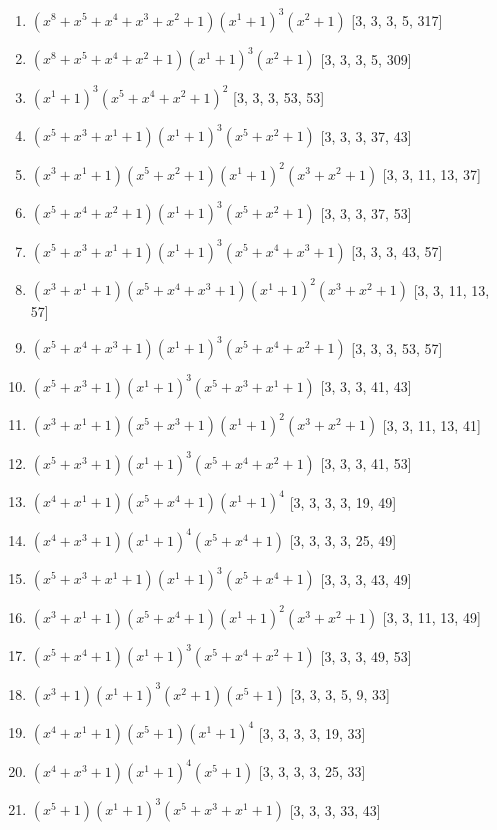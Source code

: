 \documentclass[10pt,twocolumn]{article}
\begin{document}
\begin{enumerate}
\item $(x^{8} + x^{5} + x^{4} + x^{3} + x^{2} + 1)(x^{1} + 1)^{3}(x^{2} + 1)$  [3, 3, 3, 5, 317]
\item $(x^{8} + x^{5} + x^{4} + x^{2} + 1)(x^{1} + 1)^{3}(x^{2} + 1)$  [3, 3, 3, 5, 309]
\item $(x^{1} + 1)^{3}(x^{5} + x^{4} + x^{2} + 1)^{2}$  [3, 3, 3, 53, 53]
\item $(x^{5} + x^{3} + x^{1} + 1)(x^{1} + 1)^{3}(x^{5} + x^{2} + 1)$  [3, 3, 3, 37, 43]
\item $(x^{3} + x^{1} + 1)(x^{5} + x^{2} + 1)(x^{1} + 1)^{2}(x^{3} + x^{2} + 1)$  [3, 3, 11, 13, 37]
\item $(x^{5} + x^{4} + x^{2} + 1)(x^{1} + 1)^{3}(x^{5} + x^{2} + 1)$  [3, 3, 3, 37, 53]
\item $(x^{5} + x^{3} + x^{1} + 1)(x^{1} + 1)^{3}(x^{5} + x^{4} + x^{3} + 1)$  [3, 3, 3, 43, 57]
\item $(x^{3} + x^{1} + 1)(x^{5} + x^{4} + x^{3} + 1)(x^{1} + 1)^{2}(x^{3} + x^{2} + 1)$  [3, 3, 11, 13, 57]
\item $(x^{5} + x^{4} + x^{3} + 1)(x^{1} + 1)^{3}(x^{5} + x^{4} + x^{2} + 1)$  [3, 3, 3, 53, 57]
\item $(x^{5} + x^{3} + 1)(x^{1} + 1)^{3}(x^{5} + x^{3} + x^{1} + 1)$  [3, 3, 3, 41, 43]
\item $(x^{3} + x^{1} + 1)(x^{5} + x^{3} + 1)(x^{1} + 1)^{2}(x^{3} + x^{2} + 1)$  [3, 3, 11, 13, 41]
\item $(x^{5} + x^{3} + 1)(x^{1} + 1)^{3}(x^{5} + x^{4} + x^{2} + 1)$  [3, 3, 3, 41, 53]
\item $(x^{4} + x^{1} + 1)(x^{5} + x^{4} + 1)(x^{1} + 1)^{4}$  [3, 3, 3, 3, 19, 49]
\item $(x^{4} + x^{3} + 1)(x^{1} + 1)^{4}(x^{5} + x^{4} + 1)$  [3, 3, 3, 3, 25, 49]
\item $(x^{5} + x^{3} + x^{1} + 1)(x^{1} + 1)^{3}(x^{5} + x^{4} + 1)$  [3, 3, 3, 43, 49]
\item $(x^{3} + x^{1} + 1)(x^{5} + x^{4} + 1)(x^{1} + 1)^{2}(x^{3} + x^{2} + 1)$  [3, 3, 11, 13, 49]
\item $(x^{5} + x^{4} + 1)(x^{1} + 1)^{3}(x^{5} + x^{4} + x^{2} + 1)$  [3, 3, 3, 49, 53]
\item $(x^{3} + 1)(x^{1} + 1)^{3}(x^{2} + 1)(x^{5} + 1)$  [3, 3, 3, 5, 9, 33]
\item $(x^{4} + x^{1} + 1)(x^{5} + 1)(x^{1} + 1)^{4}$  [3, 3, 3, 3, 19, 33]
\item $(x^{4} + x^{3} + 1)(x^{1} + 1)^{4}(x^{5} + 1)$  [3, 3, 3, 3, 25, 33]
\item $(x^{5} + 1)(x^{1} + 1)^{3}(x^{5} + x^{3} + x^{1} + 1)$  [3, 3, 3, 33, 43]

\end{enumerate}
\end{document}
